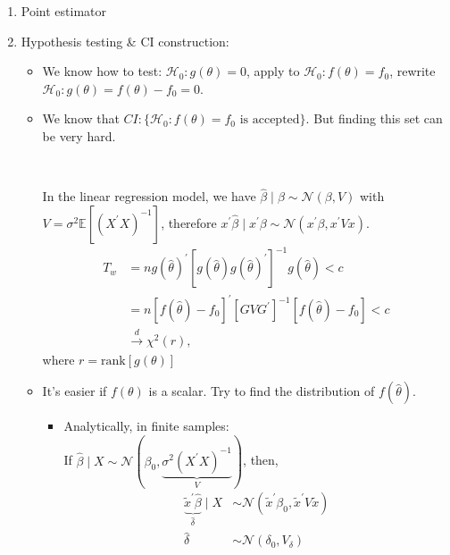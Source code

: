 \begin{enumerate}
    \item Point estimator
    \item Hypothesis testing \& CI construction:
    \begin{itemize}
        \item We know how to test: $\mathcal{H}_0: g(\theta) = 0$, apply to $\mathcal{H}_0: f(\theta) = f_0$, rewrite $\mathcal{H}_0: g(\theta) = f(\theta) - f_0 = 0$.
        \item We know that $CI: \{ \mathcal{H}_0: f(\theta) = f_0 \text{ is accepted} \}$.
              But finding this set can be very hard.
              \begin{eg}
                \

                In the linear regression model, we have $\hat{\beta} \mid \beta \sim \mathcal{N}(\beta, V)$ with $V = \sigma^2\mathbb{E}[(X^{\prime} X)^{-1}]$,
                therefore $x^{\prime} \hat{\beta} \mid x^{\prime} \beta \sim \mathcal{N}(x^{\prime} \beta, x^{\prime} Vx).$
                \begin{align*}
                    T_w &= n g(\hat{\theta})^{\prime} [g(\hat{\theta}) g(\hat{\theta})^{\prime}]^{-1} g(\hat{\theta}) < c \\
                    &= n\left[f(\hat{\theta})-f_0\right]^{\prime} \left[GVG^{\prime} \right]^{-1} \left[f(\hat{\theta})-f_0\right] < c \\
                    & \xrightarrow{d} \chi^2 (r),
                \end{align*}
                where $r = \text{rank} [g(\theta)]$
              \end{eg}
        \item It's easier if $f(\theta)$ is a scalar. Try to find the distribution of $f(\hat{\theta})$.
        \begin{itemize}
            \item Analytically, in finite samples: \\
                If $\hat{\beta} \mid X \sim \mathcal{N} \left(\beta_0, \underset{V}{\underbrace{\sigma^2 (X^{\prime} X)^{-1}}}\right)$, then,
                \begin{align*}
                    \underset{\hat{\delta}}{\underbrace{\tilde{x}^{\prime} \hat{\beta}}} \mid X &\sim \mathcal{N}\left(\tilde{x}^{\prime} \beta_0, \tilde{x}^{\prime} V\tilde{x}\right) \\
                    \hat{\delta} &\sim \mathcal{N} (\delta_0, V_{\delta}) \\

\end{align*}
\end{itemize}
\end{itemize}
\end{enumerate}
